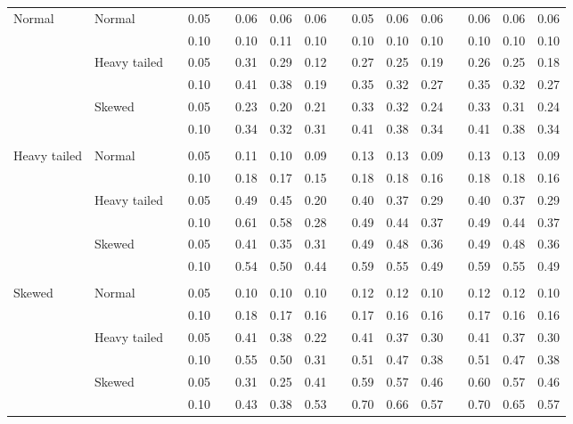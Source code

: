 \begin{table}[ht]
\begin{scriptsize}
\begin{center}
\begin{tabular}{ll p{.1cm} c p{.1cm} rrr p{.1cm} rrr p{.1cm} rrr}
\rowcolor{gray!20}Normal       & Normal       && 0.05 &&   0.06 & 0.06 & 0.06 && 0.05 & 0.06 & 0.06 && 0.06 & 0.06 & 0.06 \\ 
\rowcolor{gray!20}             &              && 0.10 &&   0.10 & 0.11 & 0.10 && 0.10 & 0.10 & 0.10 && 0.10 & 0.10 & 0.10 \\ 
\rowcolor{gray!20}             & Heavy tailed && 0.05 &&   0.31 & 0.29 & 0.12 && 0.27 & 0.25 & 0.19 && 0.26 & 0.25 & 0.18 \\ 
\rowcolor{gray!20}             &              && 0.10 &&   0.41 & 0.38 & 0.19 && 0.35 & 0.32 & 0.27 && 0.35 & 0.32 & 0.27 \\ 
\rowcolor{gray!20}             & Skewed       && 0.05 &&   0.23 & 0.20 & 0.21 && 0.33 & 0.32 & 0.24 && 0.33 & 0.31 & 0.24 \\ 
\rowcolor{gray!20}             &              && 0.10 &&   0.34 & 0.32 & 0.31 && 0.41 & 0.38 & 0.34 && 0.41 & 0.38 & 0.34 \\ 
             &&&&&&&&&&&&&&&\\
Heavy tailed & Normal       && 0.05 &&   0.11 & 0.10 & 0.09 && 0.13 & 0.13 & 0.09 && 0.13 & 0.13 & 0.09 \\ 
             &              && 0.10 &&   0.18 & 0.17 & 0.15 && 0.18 & 0.18 & 0.16 && 0.18 & 0.18 & 0.16 \\ 
             & Heavy tailed && 0.05 &&   0.49 & 0.45 & 0.20 && 0.40 & 0.37 & 0.29 && 0.40 & 0.37 & 0.29 \\ 
             &              && 0.10 &&   0.61 & 0.58 & 0.28 && 0.49 & 0.44 & 0.37 && 0.49 & 0.44 & 0.37 \\ 
             & Skewed       && 0.05 &&   0.41 & 0.35 & 0.31 && 0.49 & 0.48 & 0.36 && 0.49 & 0.48 & 0.36 \\ 
             &              && 0.10 &&   0.54 & 0.50 & 0.44 && 0.59 & 0.55 & 0.49 && 0.59 & 0.55 & 0.49 \\
             &&&&&&&&&&&&&&&\\ 
Skewed       & Normal       && 0.05 &&   0.10 & 0.10 & 0.10 && 0.12 & 0.12 & 0.10 && 0.12 & 0.12 & 0.10 \\ 
             &              && 0.10 &&   0.18 & 0.17 & 0.16 && 0.17 & 0.16 & 0.16 && 0.17 & 0.16 & 0.16 \\ 
             & Heavy tailed && 0.05 &&   0.41 & 0.38 & 0.22 && 0.41 & 0.37 & 0.30 && 0.41 & 0.37 & 0.30 \\ 
             &              && 0.10 &&   0.55 & 0.50 & 0.31 && 0.51 & 0.47 & 0.38 && 0.51 & 0.47 & 0.38 \\ 
             & Skewed       && 0.05 &&   0.31 & 0.25 & 0.41 && 0.59 & 0.57 & 0.46 && 0.60 & 0.57 & 0.46 \\ 
             &              && 0.10 &&   0.43 & 0.38 & 0.53 && 0.70 & 0.66 & 0.57 && 0.70 & 0.65 & 0.57 \\ 


\end{tabular}
\end{center}
\end{scriptsize}
\end{table}
